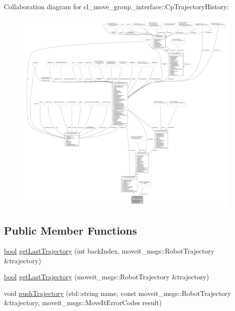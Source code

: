Collaboration diagram for cl\+\_\+move\+\_\+group\+\_\+interface\+:\+:Cp\+Trajectory\+History\+:
\nopagebreak
\begin{figure}[H]
\begin{center}
\leavevmode
\includegraphics[width=350pt]{classcl__move__group__interface_1_1CpTrajectoryHistory__coll__graph}
\end{center}
\end{figure}
\subsection*{Public Member Functions}
\begin{DoxyCompactItemize}
\item 
\hyperlink{classbool}{bool} \hyperlink{classcl__move__group__interface_1_1CpTrajectoryHistory_acca64f5923a0960c704e3e8a727ba3ae}{get\+Last\+Trajectory} (int back\+Index, moveit\+\_\+msgs\+::\+Robot\+Trajectory \&trajectory)
\item 
\hyperlink{classbool}{bool} \hyperlink{classcl__move__group__interface_1_1CpTrajectoryHistory_aa9026698871b1e9d3ef5ee29e362802f}{get\+Last\+Trajectory} (moveit\+\_\+msgs\+::\+Robot\+Trajectory \&trajectory)
\item 
void \hyperlink{classcl__move__group__interface_1_1CpTrajectoryHistory_adf3f9a3fed4ef7b1adf23a098d3451ec}{push\+Trajectory} (std\+::string name, const moveit\+\_\+msgs\+::\+Robot\+Trajectory \&trajectory, moveit\+\_\+msgs\+::\+Move\+It\+Error\+Codes result)
\end{DoxyCompactItemize}
